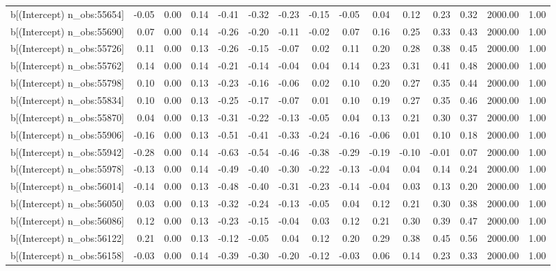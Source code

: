 \begin{table}[ht]
\begin{tabular}{rrrrrrrrrrrrrrr}
  b[(Intercept) n\_obs:55654] & -0.05 & 0.00 & 0.14 & -0.41 & -0.32 & -0.23 & -0.15 & -0.05 & 0.04 & 0.12 & 0.23 & 0.32 & 2000.00 & 1.00 \\ 
  b[(Intercept) n\_obs:55690] & 0.07 & 0.00 & 0.14 & -0.26 & -0.20 & -0.11 & -0.02 & 0.07 & 0.16 & 0.25 & 0.33 & 0.43 & 2000.00 & 1.00 \\ 
  b[(Intercept) n\_obs:55726] & 0.11 & 0.00 & 0.13 & -0.26 & -0.15 & -0.07 & 0.02 & 0.11 & 0.20 & 0.28 & 0.38 & 0.45 & 2000.00 & 1.00 \\ 
  b[(Intercept) n\_obs:55762] & 0.14 & 0.00 & 0.14 & -0.21 & -0.14 & -0.04 & 0.04 & 0.14 & 0.23 & 0.31 & 0.41 & 0.48 & 2000.00 & 1.00 \\ 
  b[(Intercept) n\_obs:55798] & 0.10 & 0.00 & 0.13 & -0.23 & -0.16 & -0.06 & 0.02 & 0.10 & 0.20 & 0.27 & 0.35 & 0.44 & 2000.00 & 1.00 \\ 
  b[(Intercept) n\_obs:55834] & 0.10 & 0.00 & 0.13 & -0.25 & -0.17 & -0.07 & 0.01 & 0.10 & 0.19 & 0.27 & 0.35 & 0.46 & 2000.00 & 1.00 \\ 
  b[(Intercept) n\_obs:55870] & 0.04 & 0.00 & 0.13 & -0.31 & -0.22 & -0.13 & -0.05 & 0.04 & 0.13 & 0.21 & 0.30 & 0.37 & 2000.00 & 1.00 \\ 
  b[(Intercept) n\_obs:55906] & -0.16 & 0.00 & 0.13 & -0.51 & -0.41 & -0.33 & -0.24 & -0.16 & -0.06 & 0.01 & 0.10 & 0.18 & 2000.00 & 1.00 \\ 
  b[(Intercept) n\_obs:55942] & -0.28 & 0.00 & 0.14 & -0.63 & -0.54 & -0.46 & -0.38 & -0.29 & -0.19 & -0.10 & -0.01 & 0.07 & 2000.00 & 1.00 \\ 
  b[(Intercept) n\_obs:55978] & -0.13 & 0.00 & 0.14 & -0.49 & -0.40 & -0.30 & -0.22 & -0.13 & -0.04 & 0.04 & 0.14 & 0.24 & 2000.00 & 1.00 \\ 
  b[(Intercept) n\_obs:56014] & -0.14 & 0.00 & 0.13 & -0.48 & -0.40 & -0.31 & -0.23 & -0.14 & -0.04 & 0.03 & 0.13 & 0.20 & 2000.00 & 1.00 \\ 
  b[(Intercept) n\_obs:56050] & 0.03 & 0.00 & 0.13 & -0.32 & -0.24 & -0.13 & -0.05 & 0.04 & 0.12 & 0.21 & 0.30 & 0.38 & 2000.00 & 1.00 \\ 
  b[(Intercept) n\_obs:56086] & 0.12 & 0.00 & 0.13 & -0.23 & -0.15 & -0.04 & 0.03 & 0.12 & 0.21 & 0.30 & 0.39 & 0.47 & 2000.00 & 1.00 \\ 
  b[(Intercept) n\_obs:56122] & 0.21 & 0.00 & 0.13 & -0.12 & -0.05 & 0.04 & 0.12 & 0.20 & 0.29 & 0.38 & 0.45 & 0.56 & 2000.00 & 1.00 \\ 
  b[(Intercept) n\_obs:56158] & -0.03 & 0.00 & 0.14 & -0.39 & -0.30 & -0.20 & -0.12 & -0.03 & 0.06 & 0.14 & 0.23 & 0.33 & 2000.00 & 1.00 \\ 

\end{tabular}
\end{table}
